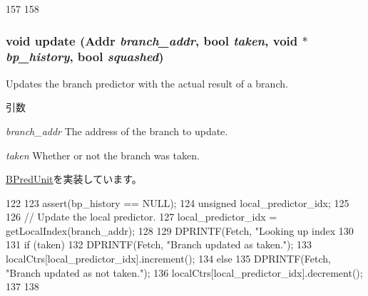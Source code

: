 \begin{DoxyCode}
157 {
158 }
\end{DoxyCode}
\hypertarget{classLocalBP_a590e0fd17d5b663e25f0e956fadc7062}{
\subsubsection[{update}]{\setlength{\rightskip}{0pt plus 5cm}void update ({\bf Addr} {\em branch\_\-addr}, \/  bool {\em taken}, \/  void $\ast$ {\em bp\_\-history}, \/  bool {\em squashed})}}
\label{classLocalBP_a590e0fd17d5b663e25f0e956fadc7062}
Updates the branch predictor with the actual result of a branch. 
\begin{DoxyParams}{引数}
\item[{\em branch\_\-addr}]The address of the branch to update. \item[{\em taken}]Whether or not the branch was taken. \end{DoxyParams}


\hyperlink{classBPredUnit_ab00dd76dc9f830cdae0edc72357c013a}{BPredUnit}を実装しています。


\begin{DoxyCode}
122 {
123     assert(bp_history == NULL);
124     unsigned local_predictor_idx;
125 
126     // Update the local predictor.
127     local_predictor_idx = getLocalIndex(branch_addr);
128 
129     DPRINTF(Fetch, "Looking up index %
130 
131     if (taken) {
132         DPRINTF(Fetch, "Branch updated as taken.\n");
133         localCtrs[local_predictor_idx].increment();
134     } else {
135         DPRINTF(Fetch, "Branch updated as not taken.\n");
136         localCtrs[local_predictor_idx].decrement();
137     }
138 }
\end{DoxyCode}


